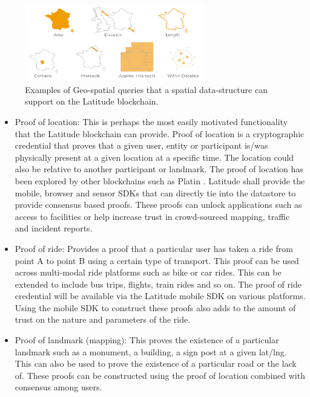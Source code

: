 \begin{figure}[t]
    \centering
    \includegraphics[width=0.70\textwidth]{geospatial_query.png}
  \caption{Examples of Geo-spatial queries that a spatial data-structure can support on the Latitude blockchain.}
    \label{fig:geo_spatial_query}
\end{figure}

 \begin{itemize}
     \item Proof of location: This is perhaps the most easily motivated functionality that the Latitude blockchain can
         provide. Proof of location is a cryptographic credential that proves that a given user, entity or participant
         is/was physically present at a given location at a specific time. The location could also be relative to
         another participant or landmark. The proof of location
         has been explored by other blockchains such as Platin \cite{platin}. Latitude shall provide the mobile, browser
         and sensor SDKs that can directly tie into the datastore to provide consensus based proofs. These proofs can
         unlock applications such as access to facilities or help increase trust in crowd-sourced mapping, traffic and incident
         reports.
     \item Proof of ride: Provides a proof that a particular user has taken a ride from point A to point B using a
         certain type of transport. This proof can be used across multi-modal ride platforms such as bike or car rides.
         This can be extended to include bus trips, flights, train rides and so on. The proof of ride credential will be
         available via the Latitude mobile SDK on various platforms. Using the mobile SDK to construct these proofs also
         adds to the amount of trust on the nature and parameters of the ride.
     \item Proof of landmark (mapping): This proves the existence of a particular landmark such as a monument, a
         building, a sign post at a given lat/lng. This can also be used to prove the existence of a particular road or
         the lack of. These proofs can be constructed using the proof of location combined with consensus among users.

\end{itemize}
